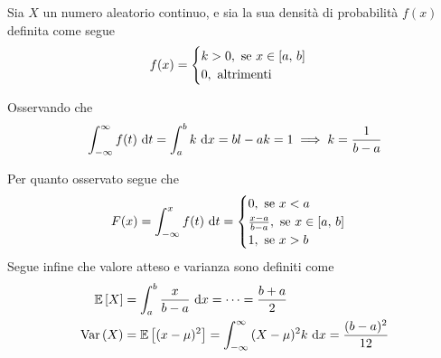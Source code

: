 \documentclass{subfiles}
\begin{document}
Sia \(X\) un numero aleatorio continuo, e sia la sua densità di probabilità \(f(x)\) definita come segue
\[
    f(x) = \begin{cases}
        k > 0, \text{se} x \in \Range*{a}{b} \\
        0, \text{altrimenti}
    \end{cases}\]
\begin{Remark*}
    Osservando che
    \[
        \Int{f(t)}{t}[-\infty][\infty] = \Int{k}{x}[a][b] = bl - ak = 1  \implies k = \Frac{1}{b - a}
    \]
\end{Remark*}
Per quanto osservato segue che
\[
    F(x) = \Int{f(t)}{t}[-\infty][x] = \begin{cases}
        0, \text{se} x < a                                 \\
        \Frac{x - a}{b - a}, \text{se} x \in \Range*{a}{b} \\
        1, \text{se} x > b
    \end{cases}\]
Segue infine che valore atteso e varianza sono definiti come
\[\begin{aligned}
        \Expected*{X} & = \Int{\Frac{x}{b - a}}{x}[a][b] = \cdots = \Frac{b + a}{2}                                      \\
        \Var{X}       & = \Expected*{(x - \mu)^{2}} = \Int{(X - \mu)^{2} k}{x}[-\infty][\infty] = \Frac{(b - a)^{2}}{12}
    \end{aligned}\]
\end{document}
